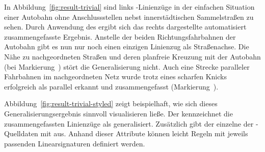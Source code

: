 \documentclass[../main/thesis.tex]{subfiles}
\begin{document}
In Abbildung~\ref{fig:result-trivial} sind links \osm-Linienzüge in der einfachen Situation einer Autobahn ohne Anschlussstellen nebst innerstädtischen Sammelstraßen zu sehen.
Durch Anwendung des  ergibt sich das rechts dargestellte automatisiert zusammengefasste Ergebnis.
Anstelle der beiden Richtungsfahrbahnen der Autobahn gibt es nun nur noch einen einzigen Linienzug als Straßenachse.
Die Nähe zu nachgeordneten Straßen und deren planfreie Kreuzung mit der Autobahn (bei Markierung~) stört die Generalisierung nicht.
Auch eine Strecke paralleler Fahrbahnen im nachgeordneten Netz wurde trotz eines scharfen Knicks erfolgreich als parallel erkannt und zusammengefasst (Markierung~).


Abbildung~\ref{fig:result-trivial-styled} zeigt beispielhaft, wie sich dieses Generalisierungsergebnis sinnvoll visualisieren ließe.
Der  kennzeichnet die zusammengefassten Linienzüge als generalisiert.
Zusätzlich gibt der  einzelne  der \osm-Quelldaten mit aus.
Anhand dieser Attribute können leicht Regeln mit jeweils passenden Linearsignaturen definiert werden.
\end{document}
